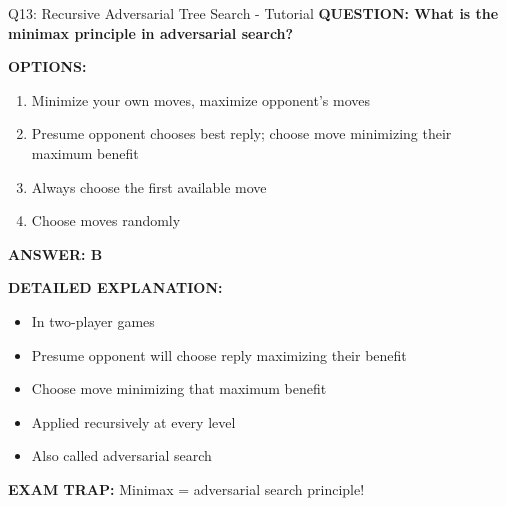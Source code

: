 \documentclass[8pt]{beamer}
\begin{document}
	\begin{frame}{Q13: Recursive Adversarial Tree Search - Tutorial}
		\fontsize{6.5}{7.5}\selectfont
		\textbf{QUESTION: What is the minimax principle in adversarial search?}
		
		\vspace{0.1cm}
		\textbf{OPTIONS:}
		\begin{enumerate}
			\item Minimize your own moves, maximize opponent's moves
			\item Presume opponent chooses best reply; choose move minimizing their maximum benefit
			\item Always choose the first available move
			\item Choose moves randomly
		\end{enumerate}
		
		\vspace{0.1cm}
		\textcolor{myblue}{\textbf{ANSWER: B}}
		
		\vspace{0.1cm}
		\textbf{DETAILED EXPLANATION:}
		\begin{itemize}
			\item In two-player games
			\item Presume opponent will choose reply maximizing their benefit
			\item Choose move minimizing that maximum benefit
			\item Applied recursively at every level
			\item Also called adversarial search
		\end{itemize}
		
		\vspace{0.1cm}
		\textcolor{myred}{\textbf{EXAM TRAP:}} Minimax = \textcolor{myblue}{adversarial search principle}!
	\end{frame}
	
\end{document}
